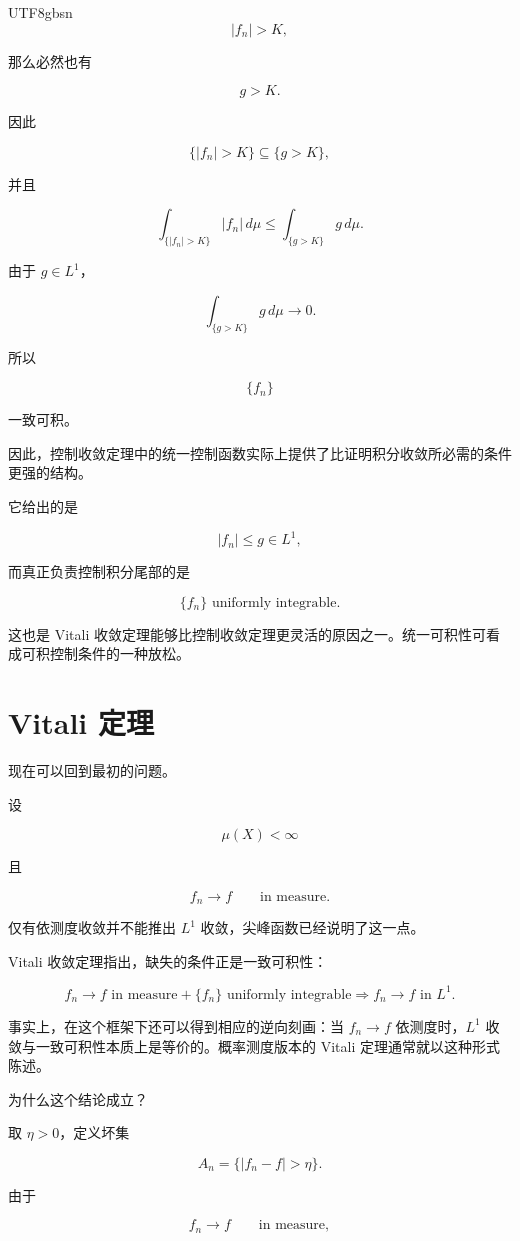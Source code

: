 \documentclass[11pt]{article}
\begin{document}
\begin{CJK*}{UTF8}{gbsn}
\[
|f_n|>K,
\]

那么必然也有

\[
g>K.
\]

因此

\[
\{|f_n|>K\}
\subseteq
\{g>K\},
\]

并且

\[
\int_{\{|f_n|>K\}}|f_n|\,d\mu
\leq
\int_{\{g>K\}}g\,d\mu.
\]

由于 $g\in L^1$，

\[
\int_{\{g>K\}}g\,d\mu\to0.
\]

所以

\[
\{f_n\}
\]

一致可积。

因此，控制收敛定理中的统一控制函数实际上提供了比证明积分收敛所必需的条件更强的结构。

它给出的是

\[
|f_n|\leq g\in L^1,
\]

而真正负责控制积分尾部的是

\[
\{f_n\}\text{ uniformly integrable}.
\]

这也是 Vitali 收敛定理能够比控制收敛定理更灵活的原因之一。统一可积性可看成可积控制条件的一种放松。


\section{Vitali 定理}


现在可以回到最初的问题。

设

\[
\mu(X)<\infty
\]

且

\[
f_n\to f
\qquad\text{in measure}.
\]

仅有依测度收敛并不能推出 $L^1$ 收敛，尖峰函数已经说明了这一点。

Vitali 收敛定理指出，缺失的条件正是一致可积性：

\[
\boxed{
f_n\to f\text{ in measure}
+
\{f_n\}\text{ uniformly integrable}
\Longrightarrow
f_n\to f\text{ in }L^1.
}
\]

事实上，在这个框架下还可以得到相应的逆向刻画：当 $f_n\to f$ 依测度时，$L^1$ 收敛与一致可积性本质上是等价的。概率测度版本的 Vitali 定理通常就以这种形式陈述。

为什么这个结论成立？

取 $\eta>0$，定义坏集

\[
A_n
=
\{|f_n-f|>\eta\}.
\]

由于

\[
f_n\to f
\qquad\text{in measure},
\]


\end{CJK*}
\end{document}
